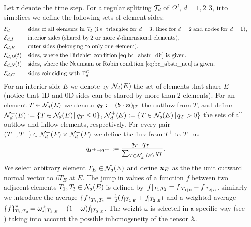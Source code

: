 Let $\tau$ denote the time step.
For a regular splitting $\mathcal T_d$ of $\Omega^d$, $d=1,2,3$, into simplices we define the following sets of element sides:
\begin{align*}
 &\mathcal E_d &&\mbox{sides of all elements in $\mathcal T_d$ (i.e. triangles for $d=3$, lines for $d=2$ and nodes for $d=1$)},\\
 &\mathcal E_{d,I} &&\mbox{interior sides (shared by 2 or more $d$-dimensional elements)},\\
 &\mathcal E_{d,B} &&\mbox{outer sides (belonging to only one element)},\\
 &\mathcal E_{d,D}(t) &&\mbox{sides, where the Dirichlet condition \eqref{eq:bc_abstr_dir} is given},\\
 &\mathcal E_{d,N}(t) &&\mbox{sides, where the Neumann or Robin condition \eqref{eq:bc_abstr_neu} is given},\\
 &\mathcal E_{d,C} &&\mbox{sides coinciding with $\Gamma^C_d$}.
\end{align*}
For an interior side $E$ we denote by $\mathcal N_d(E)$ the set of elements that share $E$ (notice that 1D and 0D sides can be shared by more than 2 elements).
For an element $T\in\mathcal N_d(E)$ we denote $q_T:=(\mathbf{\boldsymbol{b}}\cdot\mathbf{\boldsymbol{n}})_{|T}$ the outflow from $T$,
and define $\mathcal N_d^-(E):=\{T\in\mathcal N_d(E)\,|\, q_T\le 0\}$, $\mathcal N_d^+(E):=\{T\in\mathcal N_d(E)\,|\, q_T>0\}$
the sets of all outflow and inflow elements, respectively.
For every pair $(T^+,T^-)\in \mathcal N_d^+(E)\times\mathcal N_d^-(E)$ we define the flux from $T^+$ to $T^-$ as
$$ q_{T^+\to T^-} := \frac{q_{T^+} q_{T^-}}{\sum_{T\in\mathcal N_d^-(E)}{q_T}}.$$
We select arbitrary element $T_E\in\mathcal N_d(E)$ and define $\mathbf{\boldsymbol{n}}_E$ as the the unit outward normal vector to $\partial T_E$ at $E$.
The jump in values of a function $f$ between two adjacent elements $T_1,T_2\in\mathcal N_d(E)$ is defined by $[f]_{T_1,T_2}=f_{|T_{1|E}}-f_{|T_{2|E}}$,
 similarly we introduce the average $\left\{f\right\}_{T_1,T_2}=\frac12(f_{|T_{1|E}} + f_{|T_{2|E}})$
 and a weighted average $\left\{f\right\}_{T_1,T_2}^\omega=\omega f_{|T_{1|E}} + (1-\omega) f_{|T_{2|E}}$.
The weight $\omega$ is selected in a specific way (see \cite{ern_stephansen_zunino})
 taking into account the possible inhomogeneity of the tensor ${\mathbb{A}}$.

